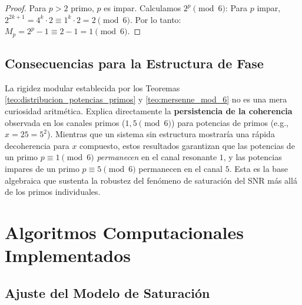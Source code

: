 \documentclass[12pt, a4paper]{article}
\theoremstyle{plain}
\theoremstyle{definition}
\theoremstyle{remark}
\begin{document}
\begin{proof}
Para $p > 2$ primo, $p$ es impar. Calculamos $2^p \pmod{6}$:
Para $p$ impar, $2^{2k+1} = 4^k \cdot 2 \equiv 1^k \cdot 2 = 2 \pmod{6}$.
Por lo tanto: $M_p = 2^p - 1 \equiv 2 - 1 = 1 \pmod{6}$.
\end{proof}

\subsection{Consecuencias para la Estructura de Fase}
La rigidez modular establecida por los Teoremas \ref{teo:distribucion_potencias_primos} y \ref{teo:mersenne_mod_6} no es una mera curiosidad aritmética. Explica directamente la \textbf{persistencia de la coherencia} observada en los canales primos ($1,5 \pmod{6}$) para potencias de primos (e.g., $x=25=5^2$). Mientras que un sistema sin estructura mostraría una rápida decoherencia para $x$ compuesto, estos resultados garantizan que las potencias de un primo $p \equiv 1 \pmod{6}$ \textit{permanecen} en el canal resonante $1$, y las potencias impares de un primo $p \equiv 5 \pmod{6}$ permanecen en el canal $5$. Esta es la base algebraica que sustenta la robustez del fenómeno de saturación del SNR más allá de los primos individuales.

\section{Algoritmos Computacionales Implementados}
\label{ap:algoritmos}

\subsection{Ajuste del Modelo de Saturación}
\label{ap:ajuste_snr}
\end{document}
